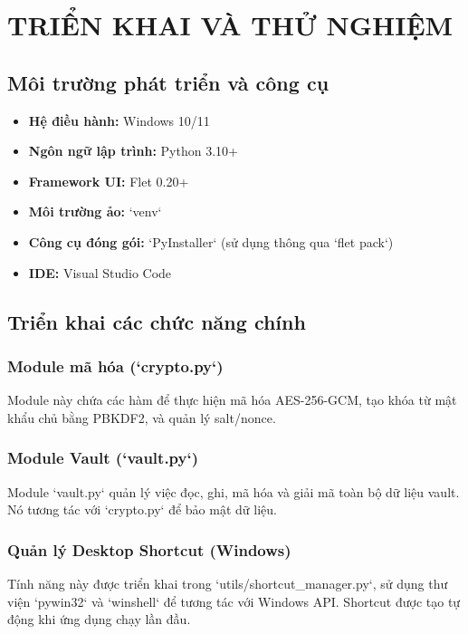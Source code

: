 \chapter{TRIỂN KHAI VÀ THỬ NGHIỆM}

\section{Môi trường phát triển và công cụ}
\begin{itemize}
    \item \textbf{Hệ điều hành:} Windows 10/11
    \item \textbf{Ngôn ngữ lập trình:} Python 3.10+
    \item \textbf{Framework UI:} Flet 0.20+
    \item \textbf{Môi trường ảo:} `venv`
    \item \textbf{Công cụ đóng gói:} `PyInstaller` (sử dụng thông qua `flet pack`)
    \item \textbf{IDE:} Visual Studio Code
\end{itemize}

\section{Triển khai các chức năng chính}
\subsection{Module mã hóa (`crypto.py`)}
Module này chứa các hàm để thực hiện mã hóa AES-256-GCM, tạo khóa từ mật khẩu chủ bằng PBKDF2, và quản lý salt/nonce.


\subsection{Module Vault (`vault.py`)}
Module `vault.py` quản lý việc đọc, ghi, mã hóa và giải mã toàn bộ dữ liệu vault. Nó tương tác với `crypto.py` để bảo mật dữ liệu.


\subsection{Quản lý Desktop Shortcut (Windows)}
Tính năng này được triển khai trong `utils/shortcut\_manager.py`, sử dụng thư viện `pywin32` và `winshell` để tương tác với Windows API. Shortcut được tạo tự động khi ứng dụng chạy lần đầu.


